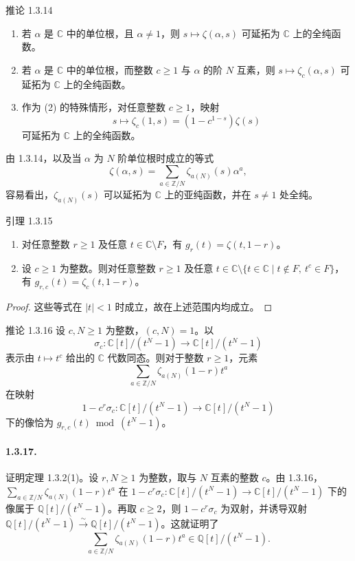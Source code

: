\begin{statement}{推论 1.3.14}
\begin{enumerate}[label=(\arabic*)]
\item 若 $\alpha$ 是 $\mathbb C$ 中的单位根，且 $\alpha\ne1$，则 $s\longmapsto\zeta(\alpha,s)$ 可延拓为 $\mathbb C$ 上的全纯函数。
\item 若 $\alpha$ 是 $\mathbb C$ 中的单位根，而整数 $c\geq1$ 与 $\alpha$ 的阶 $N$ 互素，则 $s\longmapsto\zeta_c(\alpha,s)$ 可延拓为 $\mathbb C$ 上的全纯函数。
\item 作为 (2) 的特殊情形，对任意整数 $c\geq1$，映射
\[
s\longmapsto\zeta_c(1,s)=(1-c^{1-s})\zeta(s)
\]
可延拓为 $\mathbb C$ 上的全纯函数。
\end{enumerate}
\end{statement}
由 1.3.14，以及当 $\alpha$ 为 $N$ 阶单位根时成立的等式
\[
\zeta(\alpha,s)=\sum_{a\in\mathbb Z/N}\zeta_{a(N)}(s)\alpha^a,
\]
容易看出，$\zeta_{a(N)}(s)$ 可以延拓为 $\mathbb C$ 上的亚纯函数，并在 $s\ne1$ 处全纯。

\begin{statement}{引理 1.3.15}
\begin{enumerate}[label=(\arabic*)]
\item 对任意整数 $r\geq1$ 及任意 $t\in\mathbb C\setminus F$，有
$g_r(t)=\zeta(t,1-r)$。
\item 设 $c\geq1$ 为整数。则对任意整数 $r\geq1$ 及任意
$t\in\mathbb C\setminus\{t\in\mathbb C\mid t\notin F,\ t^c\in F\}$，有
$g_{r,c}(t)=\zeta_c(t,1-r)$。
\end{enumerate}
\end{statement}
\begin{proof}
这些等式在 $|t|<1$ 时成立，故在上述范围内均成立。
\end{proof}

\begin{statement}{推论 1.3.16}
设 $c,N\geq1$ 为整数，$(c,N)=1$。以
\[
\sigma_c\colon\mathbb C[t]/(t^N-1)\longrightarrow\mathbb C[t]/(t^N-1)
\]
表示由 $t\longmapsto t^c$ 给出的 $\mathbb C$ 代数同态。则对于整数 $r\geq1$，元素
\[
\sum_{a\in\mathbb Z/N}\zeta_{a(N)}(1-r)t^a
\]
在映射
\[
1-c^r\sigma_c\colon\mathbb C[t]/(t^N-1)\longrightarrow\mathbb C[t]/(t^N-1)
\]
下的像恰为 $g_{r,c}(t)\bmod(t^N-1)$。
\end{statement}

\paragraph{1.3.17.}
证明定理 1.3.2(1)。设 $r,N\geq1$ 为整数，取与 $N$ 互素的整数 $c$。由 1.3.16，
$\sum_{a\in\mathbb Z/N}\zeta_{a(N)}(1-r)t^a$ 在
$1-c^r\sigma_c\colon\mathbb C[t]/(t^N-1)\to\mathbb C[t]/(t^N-1)$ 下的像属于
$\mathbb Q[t]/(t^N-1)$。再取 $c\geq2$，则 $1-c^r\sigma_c$ 为双射，并诱导双射
$\mathbb Q[t]/(t^N-1)\xrightarrow{\sim}\mathbb Q[t]/(t^N-1)$。这就证明了
\[
\sum_{a\in\mathbb Z/N}\zeta_{a(N)}(1-r)t^a\in\mathbb Q[t]/(t^N-1).
\]

